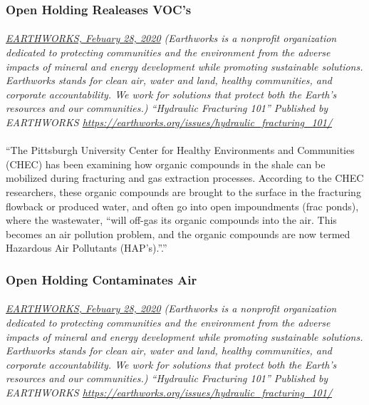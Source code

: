 \documentclass{article}
\begin{document}
\subsubsection{Open Holding Realeases VOC's}
\paragraph{}
\small
\textit{
\underline{EARTHWORKS, Febuary 28, 2020}
(Earthworks is a nonprofit organization dedicated to protecting communities and the environment from the adverse impacts of mineral and energy development while promoting sustainable solutions. Earthworks stands for clean air, water and land, healthy communities, and corporate accountability. We work for solutions that protect both the Earth’s resources and our communities.) “Hydraulic Fracturing 101” Published by EARTHWORKS 
\url{https://earthworks.org/issues/hydraulic_fracturing_101/}}
\normalsize

\paragraph{}
``The Pittsburgh University Center for Healthy Environments and Communities (CHEC) has been examining how organic compounds in the shale can be mobilized during fracturing and gas extraction processes. According to the CHEC researchers, these organic compounds are brought to the surface in the fracturing flowback or produced water, and often go into open impoundments (frac ponds), where the wastewater, “will off-gas its organic compounds into the air. This becomes an air pollution problem, and the organic compounds are now termed Hazardous Air Pollutants (HAP’s).”.''

\newpage

\subsubsection{Open Holding Contaminates Air}
\paragraph{}
\small
\textit{
\underline{EARTHWORKS, Febuary 28, 2020}
(Earthworks is a nonprofit organization dedicated to protecting communities and the environment from the adverse impacts of mineral and energy development while promoting sustainable solutions. Earthworks stands for clean air, water and land, healthy communities, and corporate accountability. We work for solutions that protect both the Earth’s resources and our communities.) “Hydraulic Fracturing 101” Published by EARTHWORKS 
\url{https://earthworks.org/issues/hydraulic_fracturing_101/}}
\normalsize
\end{document}
